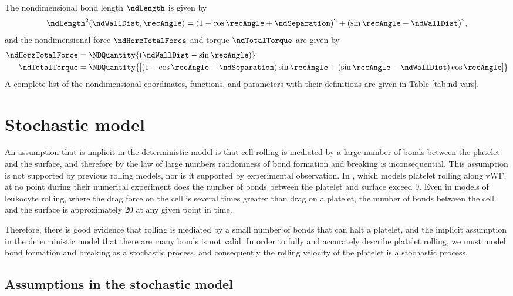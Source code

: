 The nondimensional bond length $\ndLength$ is given by
\begin{equation}
  \label{eq:nd-length}
  \ndLength^2(\ndWallDist, \recAngle) = (1 - \cos\recAngle +
  \ndSeparation)^2 + (\sin\recAngle - \ndWallDist)^2,
\end{equation}
and the nondimensional force $\ndHorzTotalForce$ and torque
$\ndTotalTorque$ are given by
\begin{align}
  \label{eq:nd-force}
  \ndHorzTotalForce &= \NDQuantity{(\ndWallDist - \sin\recAngle)} \\
  \label{eq:nd-torque}
  \ndTotalTorque &= \NDQuantity{\left[ \left(1 - \cos\recAngle +
                   \ndSeparation\right) \sin\recAngle +
                   \left(\sin\recAngle - \ndWallDist\right)
                   \cos\recAngle \right]}
\end{align}
A complete list of the nondimensional coordinates, functions, and
parameters with their definitions are given in Table
\ref{tab:nd-vars}.

\section{Stochastic model}
\label{sec:stochastic-model}

An assumption that is implicit in the deterministic model is that cell
rolling is mediated by a large number of bonds between the platelet
and the surface, and therefore by the law of large numbers randomness
of bond formation and breaking is inconsequential. This assumption is
not supported by previous rolling models, nor is it supported by
experimental observation. In \cite{Wang2013}, which models platelet
rolling along vWF, at no point during their numerical experiment does
the number of bonds between the platelet and surface exceed 9. Even in
models of leukocyte rolling, where the drag force on the cell is
several times greater than drag on a platelet, the number of bonds
between the cell and the surface is approximately 20 at any given
point in time.

Therefore, there is good evidence that rolling is mediated by a small
number of bonds that can halt a platelet, and the implicit assumption
in the deterministic model that there are many bonds is not valid. In
order to fully and accurately describe platelet rolling, we must model
bond formation and breaking as a stochastic process, and consequently
the rolling velocity of the platelet is a stochastic process.

\subsection{Assumptions in the stochastic model}
\label{sec:assumpt-stoch-model}

